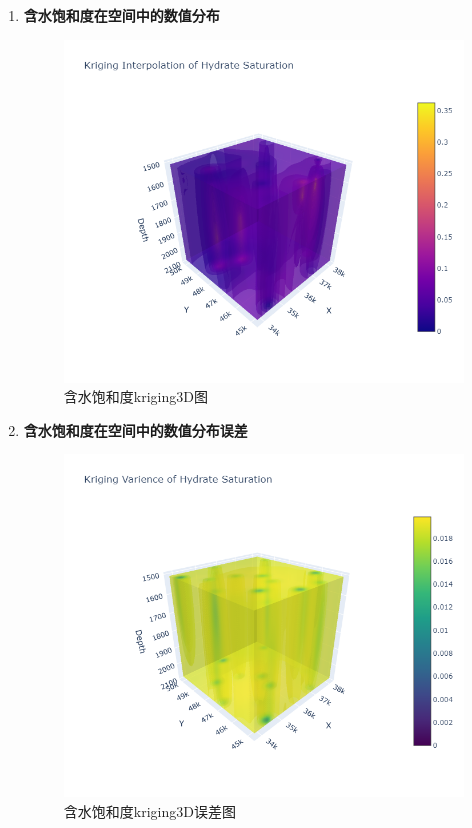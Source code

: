 \documentclass[12pt,a4paper]{nmmcm}
\begin{document}
\begin{enumerate}
  \item \textbf{含水饱和度在空间中的数值分布} \\
        \begin{figure}[h]
          \centering
          \includegraphics[scale=0.4]{figures/task2/task2-6-1.png}
          \caption{含水饱和度kriging3D图}
          \label{fig:NewWellsAndResource}
        \end{figure}
  \item \textbf{含水饱和度在空间中的数值分布误差} \\
        \begin{figure}[h]
          \centering
          \includegraphics[scale=0.4]{figures/task2/task2-6-2.png}
          \caption{含水饱和度kriging3D误差图}
          \label{fig:NewWellsAndResource}
        \end{figure}

\end{enumerate}
\end{document}
